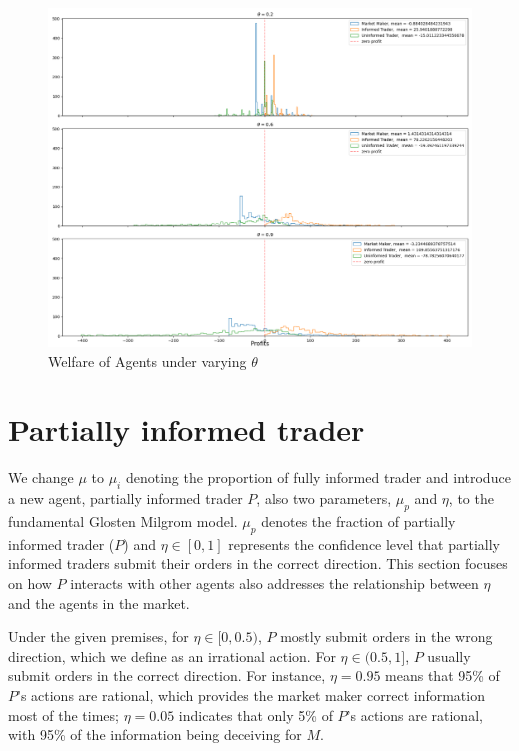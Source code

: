 \documentclass{article}
\begin{document}
\begin{figure}[H]
    \centering
    \includegraphics[scale=0.45]{v2_welfare_theta.png}
    \caption{Welfare of Agents under varying $\theta$}
    \label{fig:v2_welfare_theta}
\end{figure}

\section{Partially informed trader}\label{P trader}
We change $\mu$ to $\mu_i$ denoting the proportion of fully informed trader and introduce a new agent, partially informed trader $P$, also two parameters, $\mu_p$ and $\eta$, to the fundamental Glosten Milgrom model. $\mu_p$ denotes the fraction of partially informed trader ($P$) and $\eta \in [0, 1]$ represents the confidence level that partially informed traders submit their orders in the correct direction. This section focuses on how $P$ interacts with other agents also addresses the relationship between $\eta$ and the agents in the market. 

Under the given premises, for $\eta \in [0, 0.5)$, $P$ mostly submit orders in the wrong direction, which we define as an irrational action. For $\eta \in (0.5, 1]$, $P$ usually submit orders in the correct direction. For instance, $\eta=0.95$ means that 95\% of $P$'s actions are rational, which provides the market maker correct information most of the times; $\eta=0.05$ indicates that only 5\% of $P$'s actions are rational, with 95\% of the information being deceiving for $M$.
\end{document}
